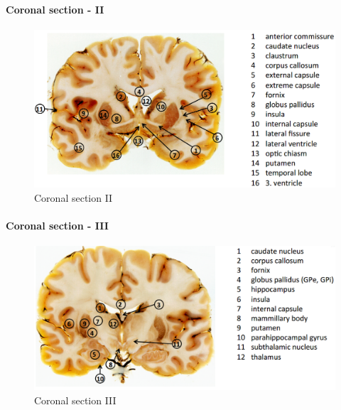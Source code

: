 \documentclass[12pt,article,oneside,a4paper]{memoir}
\begin{document}
\paragraph{Coronal section - II}
\begin{figure}[H]
	\centering
  	\includegraphics[width=\linewidth]{imgs/coronal-section-II-answer.png}
	\caption{Coronal section II}
  	\label{fig:coronalSectionI}
\end{figure}

\paragraph{Coronal section - III}
\begin{figure}[H]
	\centering
  	\includegraphics[width=\linewidth]{imgs/coronal-section-III-answer.png}
	\caption{Coronal section III}
  	\label{fig:coronalSectionI}
\end{figure}
\end{document}
